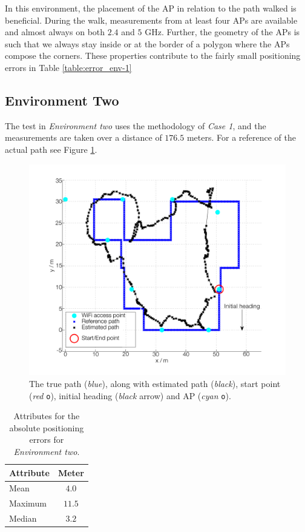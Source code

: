 \documentclass{LTHthesis}
\begin{document}
In this environment, the placement of the AP in relation to the path walked is beneficial. During the walk, measurements from at least four APs are available and almost always on both $2.4$ and $5$ GHz.  Further, the geometry of the APs is such that we always stay inside or at the border of a polygon where the APs compose the corners. These properties contribute to the fairly small positioning errors in Table \ref{table:error_env-1}  
%
\subsection{Environment Two}
%
The test in \emph{Environment two} uses the methodology of \emph{Case 1}, and the measurements are taken over a distance of $176.5$ meters. For a reference of the actual path see Figure \ref{true_vs_est_env_2_05}.    
%
\begin{figure}[!hbt]

\includegraphics[width=1\textwidth ]{images/pure_rssi/true_vs_est_env_2_05}
\caption{The true path (\emph{blue}), along with estimated path (\emph{black}), start point (\emph{red} \texttt{o}), initial heading (\emph{black} arrow) and AP (\emph{cyan} \texttt{o}).}\label{true_vs_est_env_2_05}
\end{figure}
%
\begin{table}[!hbt]
\begin{center}
\begin{tabular}{|l|c|}
\hline
\multicolumn{1}{|c|}{Attribute} & Meter \\
\hline
\hline
Mean & $4.0$ \\
\hline
Maximum & $11.5$\\
\hline
Median & $3.2$ \\
\hline 
\end{tabular}
\end{center}
\caption{Attributes for the absolute positioning errors for \emph{Environment two}.}\label{table:error_env_2}
\end{table}
\end{document}
